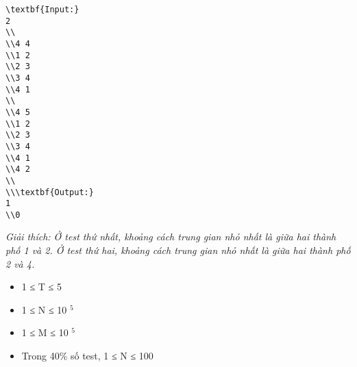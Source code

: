 \begin{verbatim}
\textbf{Input:}
2
\\
\\4 4
\\1 2
\\2 3
\\3 4
\\4 1
\\
\\4 5 
\\1 2
\\2 3
\\3 4
\\4 1
\\4 2
\\
\\\textbf{Output:}
1
\\0\end{verbatim}

\emph{    Giải thích: Ở test thứ nhất, khoảng cách trung gian nhỏ nhất là giữa hai thành phố 1 và 2. Ở test thứ hai, khoảng cách trung gian nhỏ nhất là giữa hai thành phố 2 và 4.   }
\begin{itemize}
	\item     1 ≤ T ≤ 5   
	\item     1 ≤ N ≤ 10    $^     5    $
	\item     1 ≤ M ≤ 10    $^     5    $
	\item     Trong 40\% số test, 1 ≤ N ≤ 100   
\end{itemize}